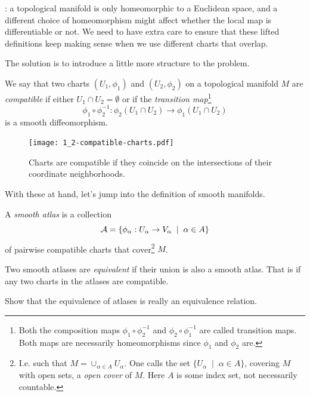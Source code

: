 : a topological manifold is only homeomorphic to a Euclidean space, and a different choice of homeomorphism might affect whether the local map is differentiable or not.
We need to have extra care to ensure that these lifted definitions keep making sense when we use different charts that overlap.

The solution is to introduce a little more structure to the problem.

\begin{defn}\label{def:crcomp}
We say that two charts $(U_1, \phi_1)$ and $(U_2, \phi_2)$ on a topological manifold $M$ are \emph{compatible} if either $U_1 \cap U_2 = \emptyset$ or if the \emph{transition map}\footnote{Both the composition maps $\phi_1 \circ \phi_2^{-1}$ and $\phi_2 \circ \phi_1^{-1}$ are called transition maps. Both maps are necessarily homeomorphisms since $\phi_1$ and $\phi_2$ are.}
\begin{equation}
  \phi_1 \circ \phi_2^{-1} : \phi_2(U_1\cap U_2) \to \phi_1(U_1 \cap U_2)
\end{equation}
is a smooth diffeomorphism.
\end{defn}

\begin{figure}[htp]
  \centering
  \texttt{[image: 1\_2-compatible-charts.pdf]}
  \caption{Charts are compatible if they coincide on the intersections of their coordinate neighborhoods.}
  \label{fig:1.2-compatible-charts}
\end{figure}

With these at hand, let's jump into the definition of smooth manifolds.

\begin{defn}\label{def:cratlas}
  A \emph{smooth atlas} is a collection
  \begin{equation}
    \mathcal{A} = \{\phi_\alpha: U_\alpha \to V_\alpha \;\mid\; \alpha\in A\}
  \end{equation}
  of pairwise compatible charts that cover\footnote{I.e. such that $M = \cup_{\alpha\in A} U_\alpha$. One calls the set $\{U_\alpha \;\mid\; \alpha\in A\}$, covering $M$ with open sets, a \emph{open cover} of $M$. Here $A$ is some index set, not necessarily countable.} $M$.

  Two smooth atlases are \emph{equivalent} if their union is also a smooth atlas. That is if any two charts in the atlases are compatible.
\end{defn}

\begin{exe}
  Show that the equivalence of atlases is really an equivalence relation.
\end{exe}

